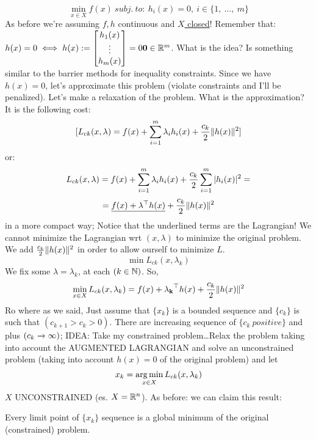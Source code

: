 \[
	\min_{x\in X}{f(x)}\ subj.\ to:\ h_i(x) = 0,\ i\in\{1,\ \dots,\ m\}
\]
As before we're assuming $f,h$ continuous and \underline{$X$ closed}! Remember that: $h(x) = 0 \iff h(x) := \begin{bmatrix}h_1(x)\\ \vdots\\h_m(x)\end{bmatrix} = 0 \mathbf{0}\in\mathbb{R}^m$.
What is the idea? Is something similar to the barrier methods for inequality constraints. Since we have $h(x)=0$, let's approximate this problem (violate constraints and I'll be penalized). Let's make a relaxation of the problem. What is the approximation? It is the following cost:
\[
	[L_{ck}(x,\lambda) = f(x) + \sum_{i=1}^m{\lambda_ih_i(x)} + \frac{c_k}{2}\lVert h(x)\rVert^2]
\]
or:
\[
	L_{ck}(x,\lambda) = f(x) + \sum_{i=1}^m{\lambda_ih_i(x)} + \frac{c_k}{2}\sum_{i=1}^m{\lvert h_i(x)\rvert^2} =
\]
\[
	= \underline{f(x) + \mathbf{\lambda}^\top h(x)} + \frac{c_k}{2}\lVert h(x)\rVert^2
\]
in a more compact way; Notice that the underlined terms are the Lagrangian! We cannot minimize the Lagrangian wrt $(x,\lambda)$ to minimize the original problem. We add $\frac{c_k}{2}\lVert h(x)\rVert^2$ in order to allow ourself to minimize $L$.
\[
	\min{L_{ck}(x,\lambda_k)}
\]
We fix some $\lambda=\lambda_k$, at each $(k\in\mathbb{N})$. So,
\[
	\min_{x\in X}{L_{ck}(x,\lambda_k) = f(x) + \mathbf{\lambda_k}^\top h(x) + \frac{c_k}{2}\lVert h(x)\rVert^2}
\]
Ro where as we said, Just assume that $\{x_k\}$ is a bounded sequence and $\{c_k\}$ is such that $(c_{k+1} > c_k > 0)$. There are increasing sequence of $\{c_k\ positive\}$ and plus $(c_k \tendsto{} \infty)$; IDEA: Take my constrained problem\dots Relax the problem taking into account the AUGMENTED LAGRANGIAN and solve an unconstrained problem (taking into account $h(x)=0$ of the original problem) and let
\[
	x_k = \operatorname*{arg\,min}_{x\in X}{L_{ck}(x,\lambda_k)}
\]
$X$ UNCONSTRAINED (es. $X=\mathbb{R}^n$). As before: we can claim this result:

\begin{prop}
Every limit point of $\{x_k\}$ sequence is a global minimum of the original (constrained) problem.
\end{prop}

